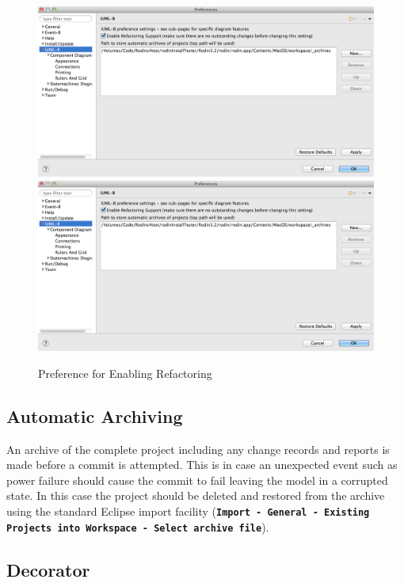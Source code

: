  \begin{figure}[!htbp]
  \centering
  \ifplastex
  \includegraphics[width=1024]{figures/image59.png}
  \else
  \includegraphics[width=1\textwidth]{figures/image59.png}
  \fi
  \caption{Preference for Enabling Refactoring}
  \label{fig:PreferenceForEnablingRefactoring}
\end{figure} 

\subsection{Automatic Archiving}

An archive of the complete project including any change records and reports is made before a commit is attempted. This is in case an unexpected event such as power failure should cause the commit to fail leaving the model in a corrupted state. In this case the project should be deleted and restored from the archive using the standard Eclipse import facility (\textbf{\texttt{Import - General - Existing Projects into Workspace - Select archive file}}).

\subsection{Decorator}

